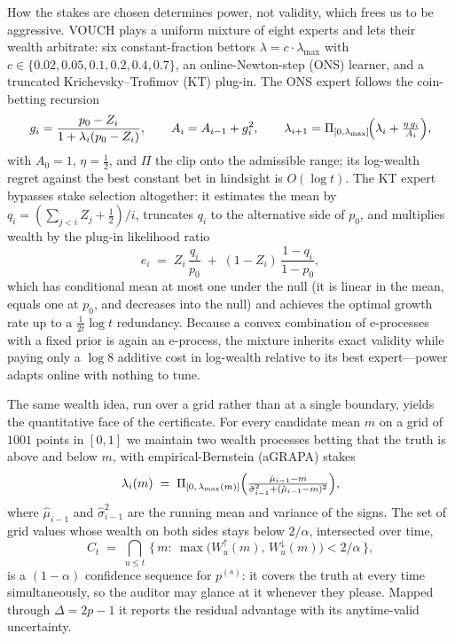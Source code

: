 \documentclass[pdflatex,sn-mathphys-num]{sn-jnl}
\theoremstyle{thmstyleone}
\theoremstyle{thmstyletwo}
\theoremstyle{thmstylethree}
\begin{document}
How the stakes are chosen determines power, not validity, which frees us to be
aggressive. VOUCH plays a uniform mixture of eight experts and lets their wealth
arbitrate: six constant-fraction bettors $\lambda = c \cdot \lambda_{\max}$ with
$c \in \{0.02, 0.05, 0.1, 0.2, 0.4, 0.7\}$, an online-Newton-step (ONS) learner, and a
truncated Krichevsky--Trofimov (KT) plug-in. The ONS expert follows the coin-betting
recursion
\begin{equation}\label{eq:ons}
g_i = \frac{p_0 - Z_i}{1 + \lambda_i (p_0 - Z_i)}, \qquad
A_i = A_{i-1} + g_i^2, \qquad
\lambda_{i+1} = \Pi_{[0,\lambda_{\max}]}\!\Bigl(\lambda_i + \tfrac{\eta\, g_i}{A_i}\Bigr),
\end{equation}
with $A_0 = 1$, $\eta = \tfrac12$, and $\Pi$ the clip onto the admissible range; its
log-wealth regret against the best constant bet in hindsight is $O(\log t)$. The KT
expert bypasses stake selection altogether: it estimates the mean by
$q_i = (\sum_{j<i} Z_j + \tfrac12)/i$, truncates $q_i$ to the alternative side of
$p_0$, and multiplies wealth by the plug-in likelihood ratio
\begin{equation}\label{eq:kt}
e_i \;=\; Z_i\,\frac{q_i}{p_0} \;+\; (1 - Z_i)\,\frac{1 - q_i}{1 - p_0},
\end{equation}
which has conditional mean at most one under the null (it is linear in the mean, equals
one at $p_0$, and decreases into the null) and achieves the optimal growth rate up to a
$\tfrac1{2t}\log t$ redundancy. Because a convex combination of e-processes with a
fixed prior is again an e-process, the mixture inherits exact validity while paying
only a $\log 8$ additive cost in log-wealth relative to its best expert---power adapts
online with nothing to tune.

The same wealth idea, run over a grid rather than at a single boundary, yields the
quantitative face of the certificate. For every candidate mean $m$ on a grid of
$1001$ points in $[0,1]$ we maintain two wealth processes betting that the truth is
above and below $m$, with empirical-Bernstein (aGRAPA) stakes
\begin{equation}\label{eq:agrapa}
\lambda_i(m) \;=\; \Pi_{[0,\,\lambda_{\max}(m)]}
\Bigl(\tfrac{\hat\mu_{i-1} - m}{\hat\sigma_{i-1}^2 + (\hat\mu_{i-1} - m)^2}\Bigr),
\end{equation}
where $\hat\mu_{i-1}$ and $\hat\sigma^2_{i-1}$ are the running mean and variance of the
signs. The set of grid values whose wealth on both sides stays below $2/\alpha$,
intersected over time,
\begin{equation}\label{eq:cs}
C_t \;=\; \bigcap_{u \le t}\,\bigl\{\, m :\ \max\bigl(W_u^{\uparrow}(m),\,
W_u^{\downarrow}(m)\bigr) < 2/\alpha \,\bigr\},
\end{equation}
is a $(1-\alpha)$ confidence sequence for $p^{(s)}$: it covers the truth at every time
simultaneously, so the auditor may glance at it whenever they please. Mapped through
$\Delta = 2p - 1$ it reports the residual advantage with its anytime-valid uncertainty.
\end{document}
